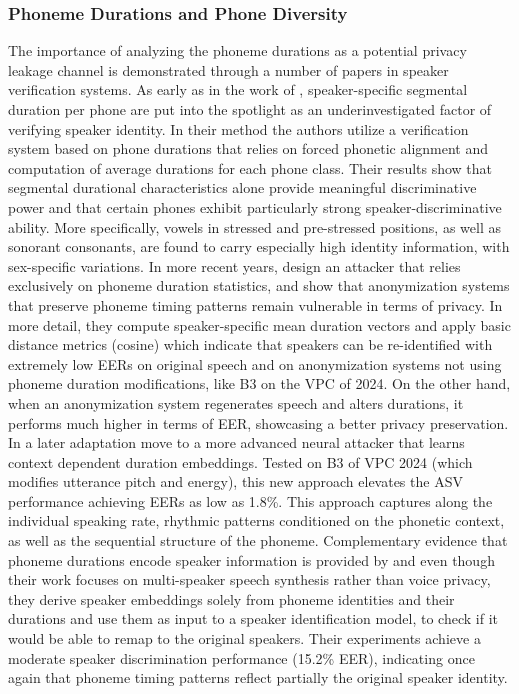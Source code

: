 \documentclass[12pt,leqno,a4paper]{article}
\begin{document}
\subsubsection{Phoneme Durations and Phone Diversity}
The importance of analyzing the phoneme durations as a potential privacy leakage channel is demonstrated through a number of papers in speaker verification systems. 
As early as in the work of \cite{bulgakova_speaker_2015}, speaker-specific segmental duration per phone are put into the spotlight as an 
underinvestigated factor of verifying speaker identity. In their method the authors utilize a verification system based on phone durations that relies on 
forced phonetic alignment and computation of average durations for each phone class. Their results show that segmental durational characteristics 
alone provide meaningful discriminative power and that certain phones exhibit particularly strong speaker-discriminative ability. 
More specifically, vowels in stressed and pre-stressed positions, as well as sonorant consonants, are found to carry especially high identity 
information, with sex-specific variations. In more recent years, \cite{tomashenko_analysis_2025} design an attacker that relies exclusively on 
phoneme duration statistics, and show that anonymization systems that preserve phoneme timing patterns remain vulnerable in terms of 
privacy. In more detail, they compute speaker-specific mean duration vectors and apply basic distance metrics (cosine) which indicate that speakers can be re-identified with extremely 
low EERs on original speech and on anonymization systems not using phoneme duration modifications, like B3 on the VPC of 2024. 
On the other hand, when an anonymization system regenerates speech and alters durations, it performs much higher in terms of EER, showcasing a better privacy preservation. 
In a later adaptation \cite{tomashenko_exploiting_2025} move to a more advanced neural attacker that learns context dependent duration embeddings. 
Tested on B3 of VPC 2024 (which modifies utterance pitch and energy), this new approach elevates the ASV performance achieving EERs as low as 1.8\%. 
This approach captures along the individual speaking rate, rhythmic patterns conditioned on the phonetic context, as well as the sequential structure of the phoneme. 
Complementary evidence that phoneme durations encode speaker information is provided by \cite{FUJITA_2024} and even though their work focuses on multi-speaker speech 
synthesis rather than voice privacy, they derive speaker embeddings solely from phoneme identities and their durations
and use them as input to a speaker identification model, to check if it would be able to remap to the original speakers. 
Their experiments achieve a moderate speaker discrimination performance (15.2\% EER), indicating once again that phoneme timing patterns reflect 
partially the original speaker identity. 
\end{document}
